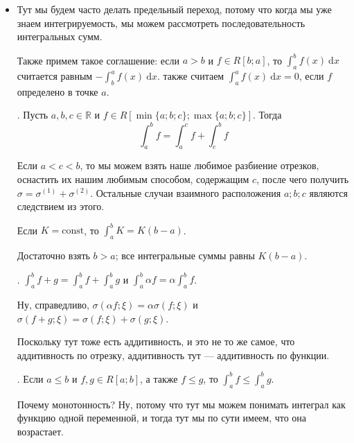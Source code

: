 \documentclass{article}
\begin{document}
    \begin{itemize}
        \item[]
        \begin{Comment}
            Тут мы будем часто делать предельный переход, потому что когда мы уже знаем интегрируемость, мы можем рассмотреть последовательность интегральных сумм.
        \end{Comment}
        \begin{Comment}
            Также примем такое соглашение: если $a>b$ и $f\in R[b;a]$, то $\int_a^bf(x)~\mathrm dx$ считается равным $-\int_b^af(x)~\mathrm dx$. также считаем $\int_a^af(x)~\mathrm dx=0$, если $f$ определено в точке $a$.
        \end{Comment}
        \thm {}. Пусть $a, b, c\in\mathbb R$ и $f\in R[\min\{a;b;c\};\max\{a;b;c\}]$. Тогда
        $$\int_a^bf=\int_a^cf+\int_c^bf$$
        \begin{Proof}
            Если $a<c<b$, то мы можем взять наше любимое разбиение отрезков, оснастить их нашим любимым способом, содержащим $c$, после чего получить $\sigma=\sigma^{(1)}+\sigma^{(2)}$. Остальные случаи взаимного расположения $a;b;c$ являются следствием из этого.
        \end{Proof}
        \thm Если $K=\mathrm{const}$, то $\int_a^bK=K(b-a)$.
        \begin{Proof}
            Достаточно взять $b>a$; все интегральные суммы равны $K(b-a)$.
        \end{Proof}
        \thm {}. $\int_a^bf+g=\int_a^bf+\int_a^bg$ и $\int_a^b\alpha f=\alpha\int_a^bf$.
        \begin{Proof}
            Ну, справедливо, $\sigma(\alpha f;\xi)=\alpha\sigma(f;\xi)$ и $\sigma(f+g;\xi)=\sigma(f;\xi)+\sigma(g;\xi)$.
        \end{Proof}
        \begin{Comment}
            Поскольку тут тоже есть аддитивность, и это не то же самое, что аддитивность по отрезку, аддитивность тут --- аддитивность по функции.
        \end{Comment}
        \thm {}. Если $a\leqslant b$ и $f,g\in R[a;b]$, а также $f\leqslant g$, то $\int_a^bf\leqslant\int_a^bg$.
        \begin{Comment}
            Почему монотонность? Ну, потому что тут мы можем понимать интеграл как функцию одной переменной, и тогда тут мы по сути имеем, что она возрастает.

\end{Comment}
\end{itemize}
\end{document}
